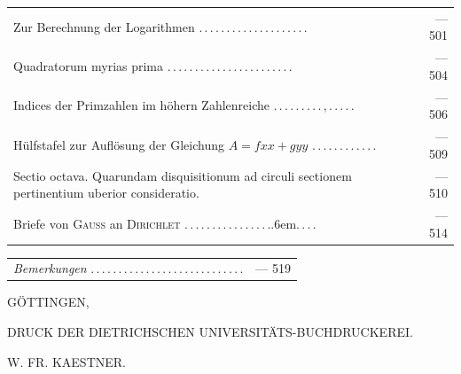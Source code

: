 \begin{longtable}{@{}p{.86\linewidth}@{\quad}r@{}}
Zur Berechnung der Logarithmen .\,.\,.\,.\,.\,.\,.\,.\,.\,.\,.\,.\,.\,.\,.\,.\,.\,.\,.\,. & — 501 \\[3pt]
Quadratorum myrias prima .\,.\,.\,.\,.\,.\,.\,.\,.\,.\,.\,.\,.\,.\,.\,.\,.\,.\,.\,.\,.\,.\,. & — 504 \\[3pt]
Indices der Primzahlen im höhern Zahlenreiche .\,.\,.\,.\,.\,.\,.\,.\,.\,,\,.\,.\,.\,.\,. & — 506 \\[3pt]
Hülfstafel zur Auflösung der Gleichung $A=fxx+gyy$ .\,.\,.\,.\,.\,.\,.\,.\,.\,.\,.\,. & — 509 \\[3pt]
Sectio octava. Quarundam disquisitionum ad circuli sectionem pertinentium uberior consideratio.  & — 510 \\[3pt]
Briefe von \textsc{Gauss} an \textsc{Dirichlet} .\,.\,.\,.\,.\,.\,.\,.\,.\,.\,.\,.\,.\,.\,.\,.\kern.6em.\,.\,.\,. & — 514 \\[3pt]
\end{longtable}\endgroup
\begingroup\fontsize{10}{13}\selectfont
\begin{longtable}{@{}p{.86\linewidth}@{\quad}r@{}}
\textit{Bemerkungen} .\,.\,.\,.\,.\,.\,.\,.\,.\,.\,.\,.\,.\,.\,.\,.\,.\,.\,.\,.\,.\,.\,.\,.\,.\,.\,.\,. & — 519 \\[3pt]
\end{longtable}\endgroup
\begin{center}
GÖTTINGEN,\par\smallskip
DRUCK DER DIETRICHSCHEN UNIVERSITÄTS-BUCHDRUCKEREI.\par\smallskip
W. FR. KAESTNER.
\end{center}
